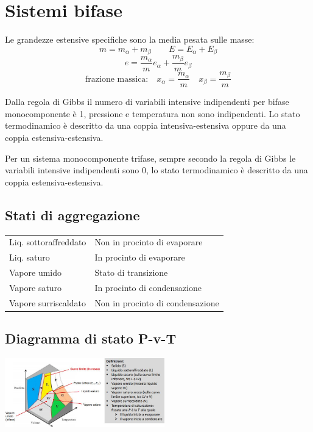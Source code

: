 \section{Sistemi bifase}

Le grandezze estensive specifiche sono la media pesata sulle masse:
\[m = m_\alpha + m_\beta \qquad E = E_\alpha + E_\beta\]
\[e = \frac{m_\alpha}{m}e_\alpha + \frac{m_\beta}{m}e_\beta\]
\[\text{frazione massica:} \quad x_\alpha = \frac{m_\alpha}{m} \quad x_\beta = \frac{m_\beta}{m} \]

Dalla regola di Gibbs il numero di variabili intensive indipendenti per bifase monocomponente è 1, pressione e temperatura non sono indipendenti. Lo stato termodinamico è descritto da una coppia intensiva-estensiva oppure da una coppia estensiva-estensiva.

Per un sistema monocomponente trifase, sempre secondo la regola di Gibbs le variabili intensive indipendenti sono 0, lo stato termodinamico è descritto da una coppia estensiva-estensiva.

\subsection{Stati di aggregazione}
\begin{tabular}{p{2.7cm}p{4.5cm}}
    Liq. sottoraffreddato & Non in procinto di evaporare \\
    Liq. saturo & In procinto di evaporare \\
    Vapore umido & Stato di transizione \\
    Vapore saturo & In procinto di condensazione \\
    Vapore surriscaldato & Non in procinto di condensazione \\
\end{tabular}

\subsection{Diagramma di stato P-v-T}

\begin{center}
    \includegraphics[height=3cm]{Diagramma di stato P-v-T.JPG}
\end{center}


